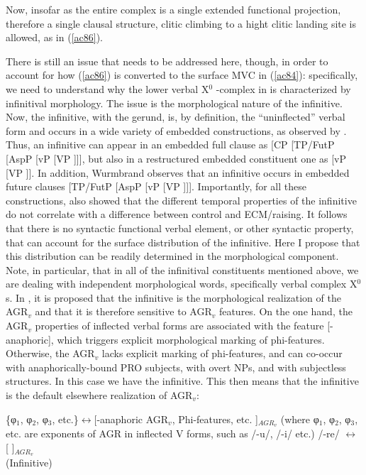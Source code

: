 \documentclass[output=paper]{langscibook}
\begin{document}
Now, insofar as the entire complex is a single extended functional projection, therefore a single clausal structure, clitic climbing to a hight clitic landing site is allowed, as in (\ref{ac86}). 

There is still an issue that needs to be addressed here, though, in order to account for how (\ref{ac86}) is converted to the surface MVC in (\ref{ac84}): specifically, we need to understand why the lower verbal X$^0$ -complex in  is characterized by infinitival morphology. The issue is the morphological nature of the infinitive. Now, the infinitive, with the gerund, is, by definition, the “uninflected” verbal form and occurs in a wide variety of embedded constructions, as observed by \cite{wurmbrand2014a}.  Thus, an infinitive can appear in an embedded full clause as [CP [TP/FutP [AspP [vP [VP ]]], but also in a restructured embedded constituent one as [vP [VP ]].  In addition, Wurmbrand observes that an infinitive occurs in embedded future clauses  [TP/FutP [AspP [vP [VP ]]]. Importantly, for all these constructions, \cite{wurmbrand2014a} also showed that the different temporal properties of the infinitive do not correlate with a difference between control and ECM/raising. It follows that there is no syntactic functional verbal element, or other syntactic property, that can account for the surface distribution of the infinitive. Here I propose that this distribution can be readily determined in the morphological component. Note, in particular, that in all of the infinitival constituents mentioned above, we are dealing with independent morphological words, specifically verbal complex X$^0$s. In \cite{calabrese1993a}, it is proposed that the infinitive is the morphological realization of the  AGR$_v$ and that it is therefore sensitive to  AGR$_v$ features. On the one hand, the  AGR$_v$ properties of inflected verbal forms are associated with the feature [-anaphoric], which triggers explicit morphological marking of phi-features.  Otherwise, the  AGR$_v$ lacks explicit marking of phi-features, and can co-occur with anaphorically-bound PRO subjects, with overt NPs, and with subjectless structures. In this case we have the infinitive. This then means that the infinitive is the default elsewhere realization of AGR$_v$:

\ea\label{ac89}
    \ea \label{ac89a}\{φ$_1$, φ$_2$, φ$_3$, etc.\}$\longleftrightarrow$[-anaphoric  AGR$_v$, Phi-features, etc. ]$_{AGR_v}$
       (where φ$_1$, φ$_2$, φ$_3$, etc. are exponents of AGR in inflected V forms, such as /-u/, /-i/ etc.)
    \ex \label{ac89b}/-re/ $\longleftrightarrow$  [   ]$_{AGR_v}$\\
     (Infinitive)
    \z
\z
\end{document}
